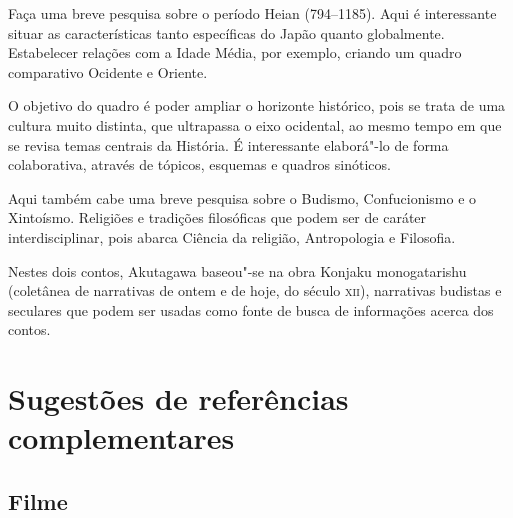 \documentclass[12pt]{extarticle}
\begin{document}
Faça uma breve pesquisa sobre o período Heian (794--1185). Aqui é interessante
situar as características tanto específicas do Japão quanto globalmente.
Estabelecer relações com a Idade Média, por exemplo, criando um quadro
comparativo Ocidente e Oriente.

O objetivo do quadro é poder ampliar o horizonte histórico, pois se trata de
uma cultura muito distinta, que ultrapassa o eixo ocidental, ao mesmo tempo em
que se revisa temas centrais da História. É interessante elaborá"-lo de forma
colaborativa, através de tópicos, esquemas e quadros sinóticos.

Aqui também cabe uma breve pesquisa sobre o Budismo, Confucionismo e o
Xintoísmo. Religiões e tradições filosóficas que podem ser de caráter
interdisciplinar, pois abarca Ciência da religião, Antropologia e Filosofia.

Nestes dois contos, Akutagawa baseou"-se na obra Konjaku monogatarishu
(coletânea de narrativas de ontem e de hoje, do século \textsc{xii}),
narrativas budistas e seculares que podem ser usadas como fonte de busca de
informações acerca dos contos.

\section{Sugestões de referências complementares}

\subsection{Filme}
\end{document}
